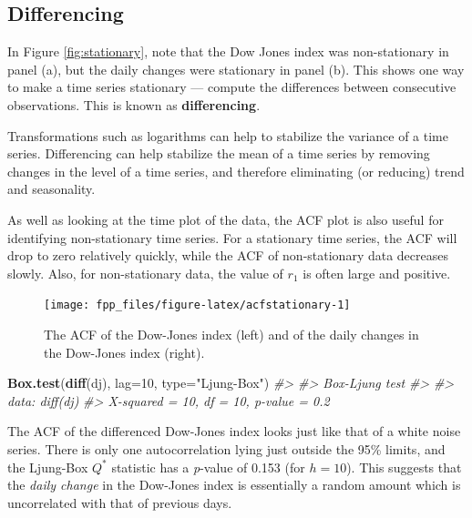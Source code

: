 \documentclass[]{book}
\newenvironment{Shaded}{\begin{snugshade}}{\end{snugshade}}
\newcommand{\CommentTok}[1]{\textcolor[rgb]{0.56,0.35,0.01}{\textit{#1}}}
\newcommand{\DataTypeTok}[1]{\textcolor[rgb]{0.13,0.29,0.53}{#1}}
\newcommand{\DecValTok}[1]{\textcolor[rgb]{0.00,0.00,0.81}{#1}}
\newcommand{\KeywordTok}[1]{\textcolor[rgb]{0.13,0.29,0.53}{\textbf{#1}}}
\newcommand{\NormalTok}[1]{#1}
\newcommand{\StringTok}[1]{\textcolor[rgb]{0.31,0.60,0.02}{#1}}
\begin{document}
\hypertarget{differencing}{%
\subsection*{Differencing}\label{differencing}}

In Figure \ref{fig:stationary}, note that the Dow Jones index was non-stationary in panel (a), but the daily changes were stationary in panel (b). This shows one way to make a time series stationary --- compute the differences between consecutive observations. This is known as \textbf{differencing}.

Transformations such as logarithms can help to stabilize the variance of a time series. Differencing can help stabilize the mean of a time series by removing changes in the level of a time series, and therefore eliminating (or reducing) trend and seasonality.

As well as looking at the time plot of the data, the ACF plot is also useful for identifying non-stationary time series. For a stationary time series, the ACF will drop to zero relatively quickly, while the ACF of non-stationary data decreases slowly. Also, for non-stationary data, the value of \(r_1\) is often large and positive.

\begin{figure}

{\centering \texttt{[image: fpp\_files/figure-latex/acfstationary-1]} 

}

\caption{The ACF of the Dow-Jones index (left) and of the daily changes in the Dow-Jones index (right).}\label{fig:acfstationary}
\end{figure}

\begin{Shaded}
\begin{Highlighting}[]
\KeywordTok{Box.test}\NormalTok{(}\KeywordTok{diff}\NormalTok{(dj), }\DataTypeTok{lag=}\DecValTok{10}\NormalTok{, }\DataTypeTok{type=}\StringTok{"Ljung-Box"}\NormalTok{)}
\CommentTok{#> }
\CommentTok{#>  Box-Ljung test}
\CommentTok{#> }
\CommentTok{#> data:  diff(dj)}
\CommentTok{#> X-squared = 10, df = 10, p-value = 0.2}
\end{Highlighting}
\end{Shaded}

The ACF of the differenced Dow-Jones index looks just like that of a white noise series. There is only one autocorrelation lying just outside the 95\% limits, and the Ljung-Box \(Q^*\) statistic has a \emph{p}-value of 0.153 (for \(h=10\)). This suggests that the \emph{daily change} in the Dow-Jones index is essentially a random amount which is uncorrelated with that of previous days.
\end{document}
